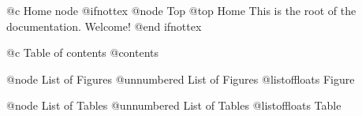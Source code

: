 @c Home node
@ifnottex
@node Top
@top Home
This is the root of the documentation. Welcome!
@end ifnottex

@c Table of contents
@contents

@node List of Figures
@unnumbered List of Figures
@listoffloats Figure

@node List of Tables
@unnumbered List of Tables
@listoffloats Table

